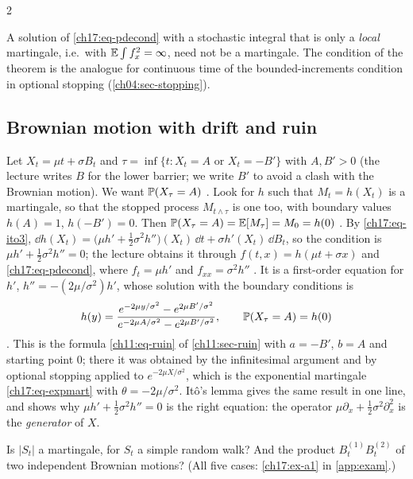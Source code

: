 \begin{paracol}{2}
\begin{remark}
A solution of \eqref{ch17:eq-pdecond} with a stochastic integral that is only a \emph{local} martingale, i.e.\ with $\mathbb{E}\int f_x^2=\infty$, need not be a martingale. The condition of the theorem
is the analogue for continuous time of the bounded-increments condition in optional stopping (\cref{ch04:sec-stopping}).
\end{remark}

\subsection{Brownian motion with drift and ruin}\label{ch17:sec-ruin}
Let $X_t=\mu t+\sigma B_t$ and $\tau=\inf\{t:X_t=A\text{ or }X_t=-B'\}$ with $A,B'>0$ (the lecture writes $B$ for the lower barrier; we write $B'$ to avoid a clash with the Brownian motion). We want $\mathbb{P}(X_\tau=A)$
. Look for $h$ such that $M_t=h(X_t)$ is a martingale, so that the stopped process $M_{t\wedge\tau}$ is one too, with boundary values $h(A)=1$, $h(-B')=0$. Then
$\mathbb{P}(X_\tau=A)=\mathbb{E}[M_\tau]=M_0=h(0)$ . By \eqref{ch17:eq-ito3}, $\dd h(X_t)=\bigl(\mu h'+\tfrac12\sigma^2h''\bigr)(X_t)\,\dd t+\sigma h'(X_t)\,\dd B_t$, so the condition
is $\mu h'+\tfrac12\sigma^2h''=0$; the lecture obtains it through $f(t,x)=h(\mu t+\sigma x)$ and \eqref{ch17:eq-pdecond}, where $f_t=\mu h'$ and $f_{xx}=\sigma^2h''$
. It is a first-order equation for $h'$, $h''=-(2\mu/\sigma^2)h'$, whose solution with the boundary conditions is
\[
  h(y)=\frac{e^{-2\mu y/\sigma^2}-e^{2\mu B'/\sigma^2}}{e^{-2\mu A/\sigma^2}-e^{2\mu B'/\sigma^2}},\qquad \mathbb{P}(X_\tau=A)=h(0)
\]
. This is the formula \eqref{ch11:eq-ruin} of \cref{ch11:sec-ruin} with $a=-B'$, $b=A$ and starting point $0$; there it was obtained by the infinitesimal argument and by
optional stopping applied to $e^{-2\mu X/\sigma^2}$, which is the exponential martingale \eqref{ch17:eq-expmart} with $\theta=-2\mu/\sigma^2$.
It\^o's lemma gives the same result in one line, and shows why $\mu h'+\tfrac12\sigma^2h''=0$ is the right equation: the operator $\mu\partial_x+\tfrac12\sigma^2\partial_x^2$ is the \emph{generator} of $X$.

\begin{exercise}\label{ch17:ex-a1-short}
Is $|S_t|$ a martingale, for $S_t$ a simple random walk? And the product $B^{(1)}_tB^{(2)}_t$ of two independent Brownian motions? (All five cases: \cref{ch17:ex-a1} in \cref{app:exam}.)
\end{exercise}


\end{paracol}
